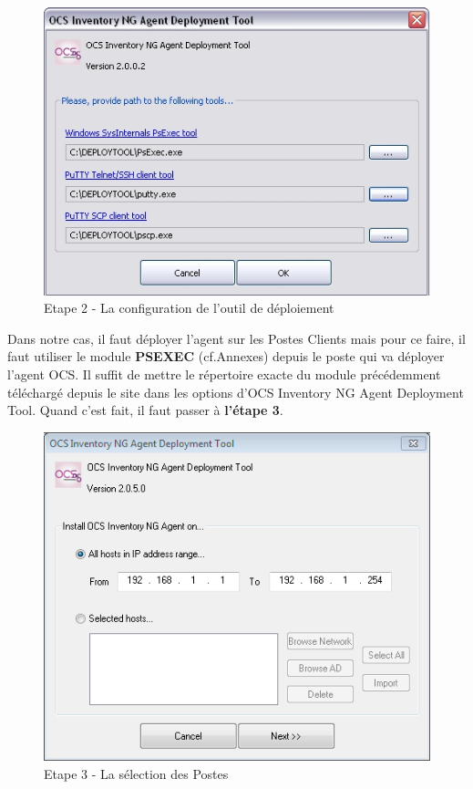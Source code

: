 \documentclass[11pt,a4paper,oneside]{article}
\begin{document}
\begin{figure}[hbtp]
  \centering
  \includegraphics[scale=0.5]{Script/2.jpg}
  \caption{Etape 2 - La configuration de l'outil de déploiement}
\end{figure} 
Dans notre cas, il faut déployer l'agent sur les Postes Clients mais pour ce faire, il faut utiliser le module \textbf{PSEXEC} (cf.Annexes) depuis le poste qui va déployer l'agent OCS. Il suffit de mettre le répertoire exacte du module précédemment téléchargé depuis le site dans les options d'OCS Inventory NG Agent Deployment Tool. Quand c'est fait, il faut passer à \textbf{l'étape 3}. \\

\begin{figure}[hbtp]
 \centering
 \includegraphics[scale=0.7]{Script/3.png}
 \caption{Etape 3 - La sélection des Postes}
 \end{figure}
  
\end{document}
